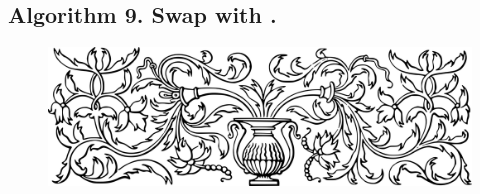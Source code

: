 \documentclass[preview]{standalone}
\begin{document}
\subsection[Swap lambda with iota.]{
    \color{section} Algorithm 9. \color{black} Swap \bm{$\lambda$} with \bm{$\iota$}.
}
\vspace{-1\baselineskip}

\vspace{1\baselineskip}
\begin{center}
    
\end{center}
\vspace{.7\baselineskip}
\begin{center}
    
\end{center}
\pagebreak


\begin{figure}[!h]
    \centering
    \includegraphics[width=14cm]{../resources/jpg/3.1.algorithms/border1.png}
\end{figure}
\end{document}
